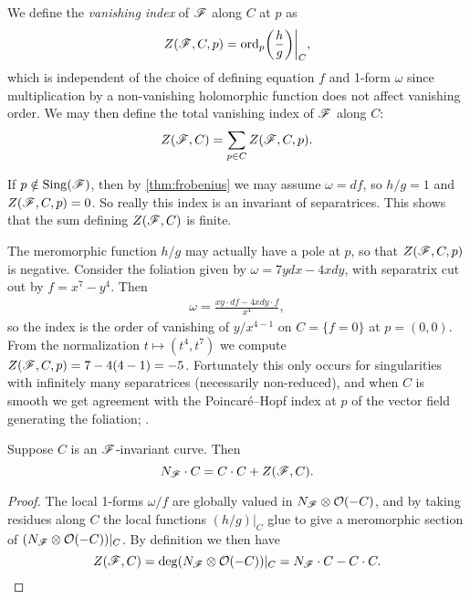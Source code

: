 \begin{definition}
    We define the \emph{vanishing index} of $\mathscr{F}$ along $C$ at $p$ as
    \begin{equation*}
        Z(\mathscr{F},C,p) = \operatorname{ord}_p\biggl(\frac{h}{g}\biggr)\bigg|_C,
    \end{equation*}
    which is independent of the choice of defining equation $f$ and 1-form
    $\omega$ since multiplication by a non-vanishing holomorphic function does
    not affect vanishing order. We may then define the total vanishing index of
    $\mathscr{F}$ along $C$:
    \begin{equation*}
        Z(\mathscr{F},C) = \sum_{p\in C}Z(\mathscr{F},C,p).
    \end{equation*}
\end{definition}

\begin{remark}
    If $p\notin\operatorname{Sing}(\mathscr{F})$, then by \cref{thm:frobenius} we may assume
    $\omega=df$, so $h/g=1$ and $Z(\mathscr{F},C,p)=0$. So really this index is an
    invariant of separatrices. This shows that the sum defining $Z(\mathscr{F},C)$ is
    finite.
\end{remark}

\begin{remark}
    The meromorphic function $h/g$ may actually have a pole at $p$, so that
    $Z(\mathscr{F},C,p)$ is negative. Consider the foliation given by
    $\omega=7ydx-4xdy$, with separatrix cut out by $f=x^{7}-y^{4}$. Then
    \begin{align*}
        \omega = \frac{xy\cdot df - 4xdy\cdot f}{x^4},
    \end{align*}
    so the index is the order of vanishing of $y/x^{4-1}$ on $C=\{f=0\}$ at
    $p=(0,0)$. From the normalization $t\mapsto(t^{4},t^{7})$ we compute
    $Z(\mathscr{F},C,p)=7-4(4-1)=-5$. Fortunately this only occurs for singularities
    with infinitely many separatrices (necessarily non-reduced), and when $C$ is
    smooth we get agreement with the Poincar\'e--Hopf index at $p$ of the vector
    field generating the foliation; \cite{brunella_97}.
\end{remark}

\begin{proposition}
    Suppose $C$ is an $\mathscr{F}$-invariant curve. Then
    \begin{equation*}
        N_{\mathscr{F}}\cdot C = C\cdot C + Z(\mathscr{F},C).
    \end{equation*}
\end{proposition}

\begin{proof}
    The local 1-forms $\omega/f$ are globally valued in $N_{\mathscr{F}}\otimes\mathcal{O}(-C)$,
    and by taking residues along $C$ the local functions $(h/g)|_C$ glue to give
    a meromorphic section of $(N_{\mathscr{F}}\otimes\mathcal{O}(-C))|_C$. By definition we then
    have
    \begin{equation*}
        Z(\mathscr{F},C) = \deg(N_{\mathscr{F}}\otimes\mathcal{O}(-C))|_C = N_{\mathscr{F}}\cdot C - C\cdot C.
    \end{equation*}
\end{proof}

